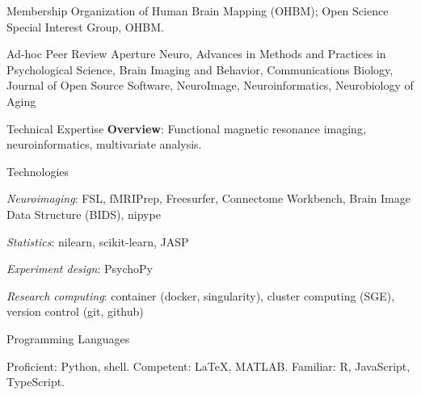 \documentclass{resume} %
\begin{document}
\begin{rSection}{Membership}
Organization of Human Brain Mapping (OHBM); Open Science Special Interest Group, OHBM.
\end{rSection}

\pagebreak

\begin{rSection}{Ad-hoc Peer Review}
Aperture Neuro,
Advances in Methods and Practices in Psychological Science,
Brain Imaging and Behavior,
Communications Biology,
Journal of Open Source Software,
NeuroImage,
Neuroinformatics,
Neurobiology of Aging
\end{rSection}


\begin{rSection}{Technical Expertise}
  \textbf{Overview}: Functional magnetic resonance imaging,
  neuroinformatics, multivariate analysis.

\begin{rSubsection}{Technologies}{}{}{}
  \item \textit{Neuroimaging}: FSL, fMRIPrep, Freesurfer, Connectome Workbench,
                      Brain Image Data Structure (BIDS), nipype
  \item \textit{Statistics}:  nilearn, scikit-learn, JASP
  \item \textit{Experiment design}: PsychoPy
  \item \textit{Research computing}: container (docker, singularity),
                            cluster computing (SGE),
                            version control (git, github)
\end{rSubsection}
\begin{rSubsection}{Programming Languages}{}{}{}
  \item Proficient: Python, shell. Competent: \LaTeX, MATLAB. Familiar: R, JavaScript, TypeScript.
\end{rSubsection}

\end{rSection}


\end{document}
